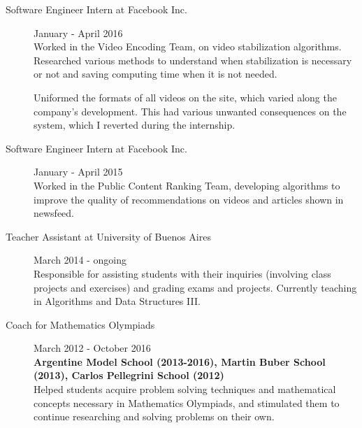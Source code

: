 \documentclass [a4paper, 11pt]{article}
\newcommand{\tabu}{\hspace*{0.7cm}}
\begin{document}
\begin{description}
  \item[Software Engineer Intern at Facebook Inc.] {\hfill January - April 2016\\
  Worked in the Video Encoding Team, on video stabilization algorithms. Researched various methods to understand when stabilization is necessary or not and saving computing time when it is not needed. %

Uniformed the formats of all videos on the site, which varied along the company's development. This had various unwanted consequences on
the system, which I reverted during the internship.
}

  \item[Software Engineer Intern at Facebook Inc.] {\hfill January - April 2015\\
Worked in the Public Content Ranking Team, developing algorithms to improve the quality of recommendations on videos and articles shown in newsfeed. %
}

  \item[Teacher Assistant at University of Buenos Aires] {\hfill March 2014 - ongoing\\
  Responsible for assisting students with their inquiries (involving class projects and 
  exercises) and grading exams and projects. Currently teaching in Algorithms 
  and Data Structures III.
}

\item[Coach for Mathematics Olympiads] {\hfill March 2012 - October 2016 \\ 
\textbf{\small Argentine Model School (2013-2016), Martin Buber School (2013), Carlos Pellegrini School (2012)} \\
Helped students acquire problem solving techniques and mathematical concepts necessary in Mathematics Olympiads, and stimulated them to continue researching and solving problems on their own.
	}

\end{description}
\end{document}

